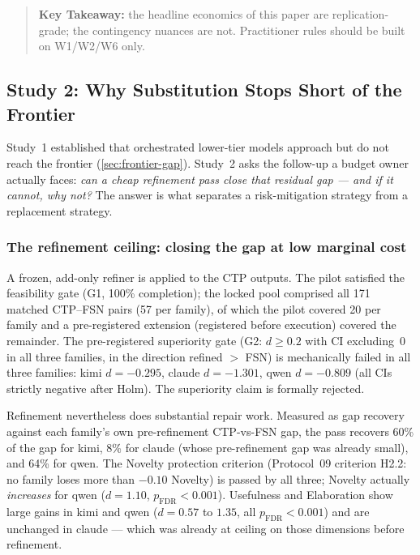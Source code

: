 \documentclass[12pt,a4paper]{article}
\begin{document}
\begin{quote}
\textbf{Key Takeaway:} the headline economics of this paper are
replication-grade; the contingency nuances are not. Practitioner rules should
be built on W1/W2/W6 only.
\end{quote}

\subsection{Study 2: Why Substitution Stops Short of the Frontier}\label{sec:study2}

Study~1 established that orchestrated lower-tier models approach but do not
reach the frontier (\cref{sec:frontier-gap}). Study~2 asks the follow-up a
budget owner actually faces: \emph{can a cheap refinement pass close that
residual gap --- and if it cannot, why not?} The answer is what separates a
risk-mitigation strategy from a replacement strategy.

\subsubsection{The refinement ceiling: closing the gap at low marginal cost}\label{sec:refinement}

A frozen, add-only refiner is applied to the CTP outputs. The pilot satisfied
the feasibility gate (G1, 100\% completion); the locked pool comprised all 171
matched CTP--FSN pairs (57 per family), of which the pilot covered 20 per
family and a pre-registered extension (registered before execution) covered
the remainder. The pre-registered superiority gate (G2: $d \ge 0.2$ with CI
excluding~0 in all three families, in the direction refined $>$ FSN) is
mechanically failed in all three families: kimi $d = -0.295$, claude $d =
-1.301$, qwen $d = -0.809$ (all CIs strictly negative after Holm). The
superiority claim is formally rejected.

Refinement nevertheless does substantial repair work. Measured as gap recovery
against each family's own pre-refinement CTP-vs-FSN gap, the pass recovers 60\%
of the gap for kimi, 8\% for claude (whose pre-refinement gap was already
small), and 64\% for qwen. The Novelty protection criterion (Protocol~09
criterion H2.2: no family loses more than $-0.10$ Novelty) is passed by all
three; Novelty actually \emph{increases} for qwen ($d = 1.10$,
$p_{\mathrm{FDR}} < 0.001$). Usefulness
and Elaboration show large gains in kimi and qwen ($d = 0.57$ to $1.35$, all
$p_{\mathrm{FDR}} < 0.001$) and are unchanged in claude --- which was already at
ceiling on those dimensions before refinement.
\end{document}
